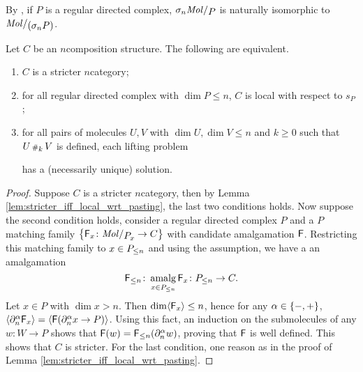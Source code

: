 \begin{rmk}
    By \cite[Proposition 5.2.14]{hadzihasanovic2024combinatorics}, if \( P \) is a regular directed complex, \( \skel{n} \molecin{P} \) is naturally isomorphic to \( \molecin{(\skel{n}P)} \).
\end{rmk}

\begin{lem} \label{lem:stricter_n_iff_local_with_dim_le_n}
    Let \( C \) be an \( n \)\nbd composition structure.
    The following are equivalent.
    \begin{enumerate}
        \item \( C \) is a stricter \( n \)\nbd category;
        \item for all regular directed complex with \( \dim P \le n \), \( C \) is local with respect to \( s_P \);
        \item for all pairs of molecules \( U, V \) with \( \dim U, \dim V \le n \) and \( k \geq 0 \) such that \( U \cp{k} V \) is defined, each lifting problem
            \begin{center}
            \end{center}
            has a (necessarily unique) solution.
    \end{enumerate}
\end{lem}
\begin{proof}
    Suppose \( C \) is a stricter \( n \)\nbd category, then by Lemma \ref{lem:stricter_iff_local_wrt_pasting}, the last two conditions holds.
    Now suppose the second condition holds, consider a regular directed complex \( P \) and a \( P \)\nbd matching family \( \set{\F_x \colon \molecin{\imel{P}{x}} \to C} \) with candidate amalgamation \( \F \).
    Restricting this matching family to \( x \in \gr{\le n}{P} \) and using the assumption, we have a an amalgamation 
    \begin{equation*}
        \gr{\le n}{\F} \colon \amalg_{x \in \gr{\le n}{P}} \F_x \colon \gr{\le n}{P} \to C.
    \end{equation*}
    Let \( x \in P \) with \( \dim x > n \).
    Then \( \dim \pcell{\F_x} \le n \), hence for any \( \a \in \set{-, +} \), \( \pcell{\bd{n}{\a} \F_x} = \pcell{\F(\bd{n}{\a} x \to P)} \).
    Using this fact, an induction on the submolecules of any \( w \colon W \to P \) shows that \( \F(w) = \gr{\le n}{\F}(\bd{n}{\a} w) \), proving that \( \F \) is well defined.
    This shows that \( C \) is stricter.
    For the last condition, one reason as in the proof of Lemma \ref{lem:stricter_iff_local_wrt_pasting}.
\end{proof}

